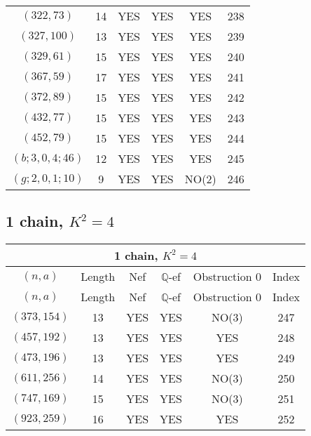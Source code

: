 \begin{longtable}{|c|c|c|c|c|c|}
$(322, 73)$ & 14 & YES & YES & YES & 238\\
$(327, 100)$ & 13 & YES & YES & YES & 239\\
$(329, 61)$ & 15 & YES & YES & YES & 240\\
$(367, 59)$ & 17 & YES & YES & YES & 241\\
$(372, 89)$ & 15 & YES & YES & YES & 242\\
$(432, 77)$ & 15 & YES & YES & YES & 243\\
$(452, 79)$ & 15 & YES & YES & YES & 244\\
$(b; 3, 0, 4; 46)$ & 12 & YES & YES & YES & 245\\
$(g; 2, 0, 1; 10)$ & 9 & YES & YES & NO(2) & 246
\end{longtable}
\subsection{1 chain, $K^2 = 4$}
\begin{longtable}{|c|c|c|c|c|c|}
\hline
\multicolumn{6}{|c|}{1 chain, $K^2 = 4$}\\
\hline
$(n,a)$ & Length & Nef & $\mathbb Q$-ef & Obstruction 0 & Index\\
\hline
\endfirsthead

\hline
$(n,a)$ & Length & Nef & $\mathbb Q$-ef & Obstruction 0 & Index\\
\hline
\endhead
\hline
\endfoot

$(373, 154)$ & 13 & YES & YES & NO(3) & 247\\
$(457, 192)$ & 13 & YES & YES & YES & 248\\
$(473, 196)$ & 13 & YES & YES & YES & 249\\
$(611, 256)$ & 14 & YES & YES & NO(3) & 250\\
$(747, 169)$ & 15 & YES & YES & NO(3) & 251\\
$(923, 259)$ & 16 & YES & YES & YES & 252
\end{longtable}
